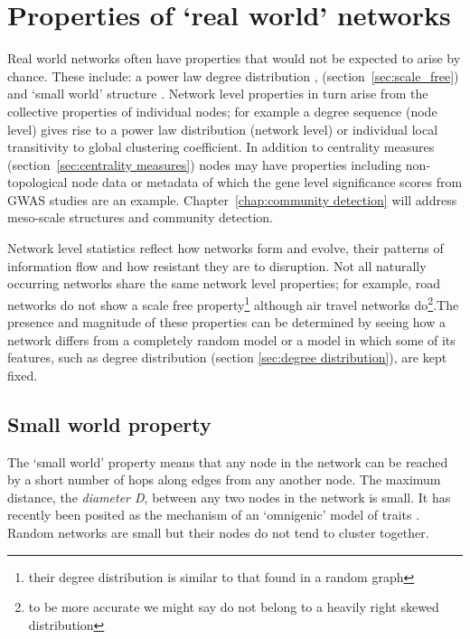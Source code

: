 \section{Properties of `real world' networks}
\label{sec:Properties of empirical networks}
Real world  networks often have properties that would not be expected to arise by chance. These include: a power law degree distribution \cite{barabasi1999emergence},\cite{barabasi1999mean} (section~\ref{sec:scale_free}) and `small world' structure \cite{watts1998collective}. Network level properties in turn arise from the collective properties of individual nodes; for example a degree sequence (node level) gives rise to a power law distribution (network level) or individual local transitivity to global clustering coefficient\cite{watts1998collective}. In addition to centrality measures (section~\ref{sec:centrality measures}) nodes may have properties including  non-topological node data\cite{wang2016approach} or metadata\cite{peel2017ground} of which the gene level significance scores from GWAS studies are an example. Chapter~\ref{chap:community detection} will address meso-scale structures and community detection. 

Network level statistics reflect how networks form and evolve, their patterns of information flow and how resistant they are to disruption. Not all naturally occurring networks share the same network level properties; for example, road networks do not show a scale free property\cite{xie2007measuring}\footnote{their degree distribution is similar to that found in a random graph} although air travel networks do\cite{boccaletti2006complex}\footnote{to be more accurate we might say do not belong to a heavily right skewed distribution}.The presence and magnitude of these properties can be determined by seeing how a network differs from a completely random model or a model in which some of its features, such as degree distribution (section \ref{sec:degree distribution}), are kept fixed. 










\subsection{Small world property}
\label{sec:Small world}
The `small world' property means that any node in the network can be reached by a short number of hops along edges from any another node. The maximum distance, the \textit{diameter D}, between any two nodes in the network is small\cite{zhu2007getting}. It has recently been posited as the mechanism of an `omnigenic' model of traits \cite{boyle2017expanded}. Random networks are small but their nodes do not tend to cluster together. 

